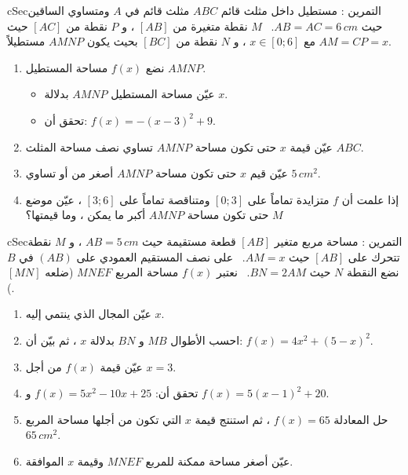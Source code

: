 \documentclass[12pt,a4paper]{article}
\newenvironment{BOX}[2]{\begin{otherlanguage}{english}\begin{arbox}{#1}{#2}}{\end{arbox}\end{otherlanguage}}
\newcounter{exo}
\newenvironment{tamrin}[1]{\stepcounter{exo}\begin{BOX}{cSec}{التمرين \theexo: #1}}{\end{BOX}}
\newenvironment{sq}{\begin{itemize}[leftmargin=2.4em,itemsep=3pt]}{\end{itemize}}
\newcommand{\qa}{\item[(أ)]}\newcommand{\qb}{\item[(ب)]}\newcommand{\qc}{\item[(جـ)]}\newcommand{\qd}{\item[(د)]}\newcommand{\qe}{\item[(هـ)]}
\begin{document}
\begin{tamrin}{مستطيل داخل مثلث قائم}
$ABC$ مثلث قائم في $A$ ومتساوي الساقين حيث $AB=AC=6\,cm$. \ $M$ نقطة متغيرة من $[AB]$ ، و $P$ نقطة من $[AC]$ حيث $AM=CP=x$ مع $x\in[0;6]$ ، و $N$ نقطة من $[BC]$ بحيث يكون $AMNP$ مستطيلاً.
\begin{enumerate}
\item نضع $f(x)$ مساحة المستطيل $AMNP$.
\begin{sq}
\qa عيّن مساحة المستطيل $AMNP$ بدلالة $x$.
\qb تحقق أن: $f(x)=-(x-3)^2+9$.
\end{sq}
\item عيّن قيمة $x$ حتى تكون مساحة $AMNP$ تساوي نصف مساحة المثلث $ABC$.
\item عيّن قيم $x$ حتى تكون مساحة $AMNP$ أصغر من أو تساوي $5\,cm^2$.
\item إذا علمت أن $f$ متزايدة تماماً على $[0;3]$ ومتناقصة تماماً على $[3;6]$ ، عيّن موضع $M$ حتى تكون مساحة $AMNP$ أكبر ما يمكن ، وما قيمتها؟
\end{enumerate}
\end{tamrin}

\begin{tamrin}{مساحة مربع متغير}
$[AB]$ قطعة مستقيمة حيث $AB=5\,cm$ ، و $M$ نقطة تتحرك على $[AB]$ حيث $AM=x$. \ على نصف المستقيم العمودي على $(AB)$ في $B$ نضع النقطة $N$ حيث $BN=2AM$. \ نعتبر $f(x)$ مساحة المربع $MNEF$ (ضلعه $[MN]$).
\begin{enumerate}
\item عيّن المجال الذي ينتمي إليه $x$.
\item احسب الأطوال $MB$ و $BN$ بدلالة $x$ ، ثم بيّن أن: $f(x)=4x^2+(5-x)^2$.
\item عيّن قيمة $f(x)$ من أجل $x=3$.
\item تحقق أن: $f(x)=5x^2-10x+25$ و $f(x)=5(x-1)^2+20$.
\item حل المعادلة $f(x)=65$ ، ثم استنتج قيمة $x$ التي تكون من أجلها مساحة المربع $65\,cm^2$.
\item عيّن أصغر مساحة ممكنة للمربع $MNEF$ وقيمة $x$ الموافقة.
\end{enumerate}
\end{tamrin}

\end{document}

